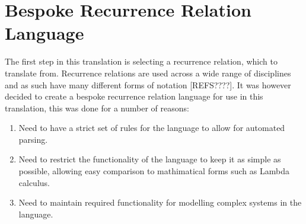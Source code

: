 \documentclass{article}
\begin{document}





\section{Bespoke Recurrence Relation Language}
The first step in this translation is selecting a recurrence relation, which to translate from. Recurrence relations are used across a wide range of disciplines and as such have many different forms of notation {\color{red} [REFS????]}. It was however decided to create a bespoke recurrence relation language for use in this translation, this was done for a number of reasons:
\begin{enumerate}
  \item Need to have a strict set of rules for the language to allow for automated parsing. 
  \item Need to restrict the functionality of the language to keep it as simple as possible, allowing easy comparison to mathimatical forms such as Lambda calculus. 
  \item Need to maintain required functionality for modelling complex systems in the language.  
\end{enumerate} 
\end{document}

